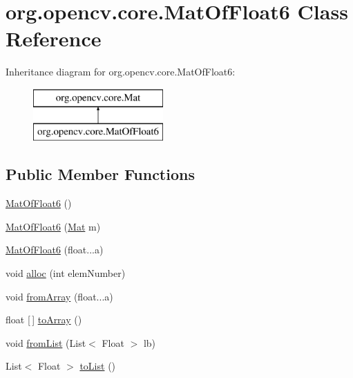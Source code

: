 \hypertarget{classorg_1_1opencv_1_1core_1_1_mat_of_float6}{}\section{org.\+opencv.\+core.\+Mat\+Of\+Float6 Class Reference}
\label{classorg_1_1opencv_1_1core_1_1_mat_of_float6}
Inheritance diagram for org.\+opencv.\+core.\+Mat\+Of\+Float6\+:\begin{figure}[H]
\begin{center}
\leavevmode
\includegraphics[height=2.000000cm]{classorg_1_1opencv_1_1core_1_1_mat_of_float6}
\end{center}
\end{figure}
\subsection*{Public Member Functions}
\begin{DoxyCompactItemize}
\item 
\mbox{\hyperlink{classorg_1_1opencv_1_1core_1_1_mat_of_float6_a6d52fe89a4b8f8bbd0274423870530dc}{Mat\+Of\+Float6}} ()
\item 
\mbox{\hyperlink{classorg_1_1opencv_1_1core_1_1_mat_of_float6_a2158330c5dbd52159e9b8cf8544d00f7}{Mat\+Of\+Float6}} (\mbox{\hyperlink{classorg_1_1opencv_1_1core_1_1_mat}{Mat}} m)
\item 
\mbox{\hyperlink{classorg_1_1opencv_1_1core_1_1_mat_of_float6_a0cf0f617f5dd650614c418b79929d84d}{Mat\+Of\+Float6}} (float...\+a)
\item 
void \mbox{\hyperlink{classorg_1_1opencv_1_1core_1_1_mat_of_float6_a104cfa222d2629effd22393eeafb941c}{alloc}} (int elem\+Number)
\item 
void \mbox{\hyperlink{classorg_1_1opencv_1_1core_1_1_mat_of_float6_a15d9c9246778b5870557a7673cdc71b6}{from\+Array}} (float...\+a)
\item 
float \mbox{[}$\,$\mbox{]} \mbox{\hyperlink{classorg_1_1opencv_1_1core_1_1_mat_of_float6_ad60238f3cbb70c6b3787ad3c7ba57804}{to\+Array}} ()
\item 
void \mbox{\hyperlink{classorg_1_1opencv_1_1core_1_1_mat_of_float6_a67cf87e9b54d0c294787323296fc0e0a}{from\+List}} (List$<$ Float $>$ lb)
\item 
List$<$ Float $>$ \mbox{\hyperlink{classorg_1_1opencv_1_1core_1_1_mat_of_float6_acd00b8a0f813213812ea8c67fcbe7c52}{to\+List}} ()
\end{DoxyCompactItemize}
